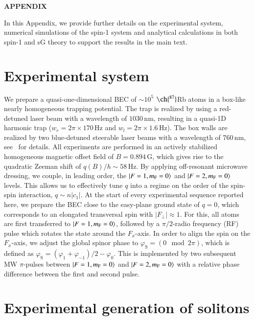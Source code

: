 \documentclass[aps,

               pra,
               twocolumn,
               amsmath,
               amssymb,
               superscriptaddress,
               reprint,
               10pt
              ]{revtex4-2}
\newcommand{\phis}{\varphi_\mathrm{S}}
\newcommand{\mf}{m_\mathrm{F}}
\newcommand{\Fperp}{F_{\perp}}
\begin{document}
\begin{appendix}

\onecolumngrid
\vspace{1cm}
\begin{center}
\textbf{APPENDIX}
\end{center}
\setcounter{equation}{0}
\setcounter{table}{0}
\makeatletter



In this Appendix, we provide further details on the experimental system, numerical simulations of the spin-1 system and analytical calculations in both spin-1 and sG theory to support the results in the main text.

\section{Experimental system}\label{app:detailsExperiment}
We prepare a quasi-one-dimensional BEC of $\sim 10^{5}$ $\ch{^{87}}$Rb atoms in a box-like nearly homogeneous
trapping potential. The trap is realized by using a red-detuned laser beam with a wavelength of $1030\,\mathrm{nm}$, resulting in a quasi-1D harmonic trap ($w_r = 2 \pi \times 170\,\mathrm{Hz}$ and $w_l = 2 \pi \times1.6\,\mathrm{Hz}$). The box walls are realized by two blue-detuned steerable laser beams with a wavelength of $760\,\mathrm{nm}$, see~\cite{Lannig2020} for details.
All experiments are performed in an actively stabilized homogeneous magnetic offset field of $B =0.894\,\mathrm{G}$, which gives rise to the quadratic Zeeman shift of $q(B)/h \sim 58\,\mathrm{Hz}$. By applying off-resonant microwave dressing, we couple, in leading order, the $\ket{F=1,\mf=0}$ and $\ket{F=2,\mf=0}$ levels. This allows us to effectively tune $q$ into a regime on the order of the spin-spin interaction, $q \sim n |c_1|$. At the start of every experimental sequence reported here, we prepare the BEC close to the easy-plane ground state of $q=0$, which corresponds to an elongated transversal spin  with $|\Fperp| \approx 1$. For this, all atoms are first transferred to $\ket{F=1,\mf=0}$, followed by a $\pi/2$-radio frequency (RF) pulse which rotates the state around the $F_x$-axis. In order to align the spin on the $F_x$-axis, we adjust the global spinor phase to $\phis =(0 \mod 2\pi)$, which is defined as $\phis = (\varphi_1 + \varphi_{-1})/2 - \varphi_0$. This is implemented by two subsequent MW $\pi$-pulses between $\ket{F=1,\mf=0}$ and $\ket{F=2,\mf=0}$ with a relative phase difference between the first and second pulse.


\section{Experimental generation of solitons}\label{app:detailsimprint}




\end{appendix}
\end{document}
